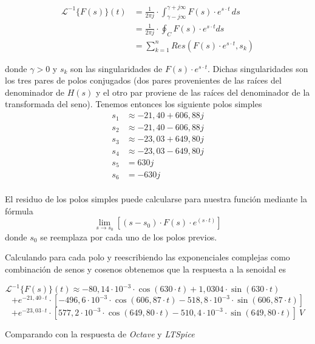 \documentclass[11pt,a4paper]{report}
\begin{document}
\begin{align*}
\mathcal{L}^{-1}\{F(s)\}(t)&=\frac{1}{2\pi j} \cdot \int_{\gamma-j\infty}^{\gamma+j\infty} F(s) \cdot e^{s \cdot t}\, ds \\
&=\frac{1}{2\pi j} \cdot \oint_C  F(s) \cdot e^{s \cdot t} ds\\ &= \sum_{k=1}^{n} Res(F(s) \cdot e^{s \cdot t}, s_{k})
\end{align*}

donde $\gamma > 0$ y $s_{k}$ son las singularidades de $F(s) \cdot e^{s \cdot t}$.
Dichas singularidades son los tres pares de polos conjugados (dos pares provenientes de las raíces del denominador de $H(s)$ y el otro par proviene de las raíces del denominador de la transformada del seno). Tenemos entonces los siguiente polos simples
\begin{align*}
s_{1} &\approx -21,40 + 606,88j\\
s_{2} &\approx -21,40 - 606,88j\\
s_{3} &\approx -23,03 + 649,80j\\
s_{4} &\approx -23,03 - 649,80j\\
s_{5} &= 630j\\
s_{6} &= -630j\\
\end{align*}

\newpage
El residuo de los polos simples puede calcularse para nuestra función mediante la fórmula
\[\lim_{s \to s_{0}} [(s-s_{0}) \cdot F(s) \cdot e^{(s \cdot t)}]\]
donde $s_{0}$ se reemplaza por cada uno de los polos previos.

\bigskip
Calculando para cada polo y reescribiendo las exponenciales complejas como combinación de senos y cosenos obtenemos que la respuesta a la senoidal es

\[\mathcal{L}^{-1}\{F(s)\}(t) \approx -80,14 \cdot 10^{-3} \cdot \cos(630 \cdot t) + 1,0304 \cdot \sin(630 \cdot t)\phantom{asdasda}\] 
\[+ e^{-21,40 \cdot t} \cdot [- 496,6 \cdot 10^{-3} \cdot \cos(606,87 \cdot t) - 518,8 \cdot 10^{-3} \cdot \sin(606,87 \cdot t)]\]
\[+ e^{-23,03 \cdot t} \cdot [577,2 \cdot 10^{-3} \cdot \cos(649,80 \cdot t) - 510,4 \cdot 10^{-3} \cdot \sin(649,80 \cdot t)] \ V\]

\bigskip
Comparando con la respuesta de \textit{Octave} y \textit{LTSpice}
\end{document}
